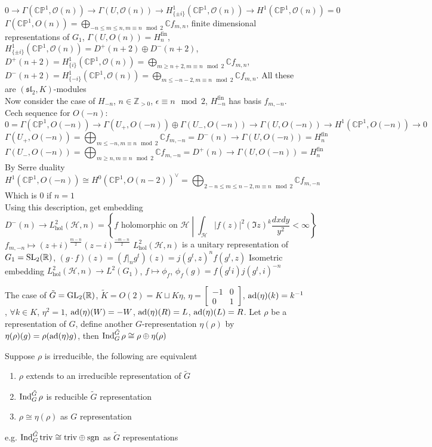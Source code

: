 \documentclass[main]{subfiles}
\begin{document}
\[0\to\Gamma(\mathbb{CP}^1,\mathcal O(n))\to\Gamma(U,\mathcal O(n))\to H^1_{\{\pm i\}}(\mathbb{CP}^1,\mathcal O(n))\to H^1(\mathbb{CP}^1,\mathcal O(n))=0\]
$\Gamma(\mathbb{CP}^1,O(n))=\bigoplus_{-n\leq m\leq n,m\equiv n\mod2}\mathbb Cf_{m,n}$, finite dimensional representations of $G_1$, $\Gamma(U,O(n))=H^{\mathrm{fin}}_n$, $H^1_{\{\pm i\}}(\mathbb{CP}^1,\mathcal O(n))=D^+(n+2)\oplus D^-(n+2)$, $D^+(n+2)=H^1_{\{i\}}(\mathbb{CP}^1,\mathcal O(n))=\bigoplus_{m\geq n+2,m\equiv n\mod2}\mathbb Cf_{m,n}$, $D^-(n+2)=H^1_{\{-i\}}(\mathbb{CP}^1,\mathcal O(n))=\bigoplus_{m\leq -n-2,m\equiv n\mod2}\mathbb Cf_{m,n}$. All these are $(\mathfrak{sl}_2,K)$-modules \\
Now consider the case of $H_{-n}$, $n\in\mathbb Z_{>0}$, $\epsilon\equiv n\mod2$, $H^{\mathrm{fin}}_{-n}$ has basis $f_{m,-n}$. Cech sequence for $O(-n)$:
\[0=\Gamma(\mathbb{CP}^1,O(-n))\to\Gamma(U_+,O(-n))\oplus\Gamma(U_-,O(-n))\to\Gamma(U,O(-n))\to H^1(\mathbb{CP}^1,O(-n))\to0\]
\[\Gamma(U_+,O(-n))=\bigoplus_{m\leq-n,m\equiv n\mod2}\mathbb Cf_{m,-n}=D^-(n)\to\Gamma(U,O(-n))=H^{\mathrm{fin}}_n\]
\[\Gamma(U_-,O(-n))=\bigoplus_{m\geq n,m\equiv n\mod2}\mathbb Cf_{m,-n}=D^+(n)\to\Gamma(U,O(-n))=H^{\mathrm{fin}}_n\]
By Serre duality
\[H^1(\mathbb{CP}^1,O(-n))\cong H^0(\mathbb{CP}^1,O(n-2))^\vee=\bigoplus_{2-n\leq m\leq n-2,m\equiv n\mod2}\mathbb Cf_{m,-n}\]
Which is $0$ if $n=1$ \\
Using this description, get embedding
\[D^-(n)\to L^2_{\mathrm{hol}}(\mathcal H,n)=\left\{f \text{ holomorphic on } \mathcal H\middle|\int_{\mathcal H}|f(z)|^2(\Im z)^k\frac{dxdy}{y^2}<\infty\right\}\]
$f_{m,-n}\mapsto(z+i)^{\frac{m-n}{2}}(z-i)^{\frac{-m-n}{2}}$
$L^2_{\mathrm{hol}}(\mathcal H,n)$ is a unitary representation of $G_1=\operatorname{SL}_2(\mathbb R)$, $(g\cdot f)(z)=(f|_ng^t)(z)=j(g^t,z)^nf(g^t,z)$
Isometric embedding $L^2_\mathrm{hol}(\mathcal H,n)\to L^2(G_1)$, $f\mapsto\phi_f$, $\phi_f(g)=f(g^ti)j(g^t,i)^{-n}$


The case of $\tilde G=\operatorname{GL}_2(\mathbb R)$, $\tilde K=O(2)=K\sqcup K\eta$, $\eta=\begin{bmatrix}
-1&0\\
0&1
\end{bmatrix}$, $\operatorname{ad}(\eta)(k)=k^{-1}$, $\forall k\in K$, $\eta^2=1$, $\operatorname{ad}(\eta)(W)=-W$, $\operatorname{ad}(\eta)(R)=L$, $\operatorname{ad}(\eta)(L)=R$. Let $\rho$ be a representation of $G$, define another $G$-representation $\eta(\rho)$ by $\eta(\rho)(g)=\rho(\operatorname{ad}(\eta)g)$, then $\operatorname{Ind}^{\tilde G}_G\rho\cong\rho\oplus\eta(\rho)$

Suppose $\rho$ is irreducible, the following are equivalent
\begin{enumerate}
\item $\rho$ extends to an irreducible representation of $\tilde G$
\item $\operatorname{Ind}^{\tilde G}_G\rho$ is reducible $\tilde G$ representation
\item $\rho\cong\eta(\rho)$ as $G$ representation
\end{enumerate}
e.g. $\operatorname{Ind}^{\tilde G}_G\mathrm{triv}\cong \mathrm{triv}\oplus \operatorname{sgn}$ as $\tilde G$ representations
\end{document}
